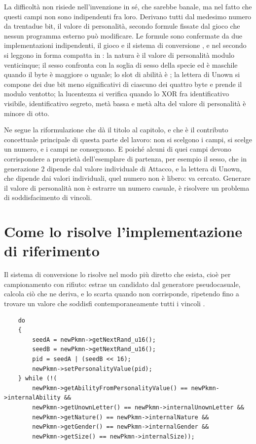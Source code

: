 La difficoltà non risiede nell'invenzione in sé, che sarebbe banale, ma nel fatto che questi campi non sono indipendenti fra loro. Derivano tutti dal medesimo numero da trentadue bit, il valore di personalità, secondo formule fissate dal gioco che nessun programma esterno può modificare. Le formule sono confermate da due implementazioni indipendenti, il gioco \cite{pokeemerald} e il sistema di conversione \cite{pccs}, e nel secondo si leggono in forma compatta in : la natura è il valore di personalità modulo venticinque; il sesso confronta  con la soglia di sesso della specie ed è maschile quando il byte è maggiore o uguale; lo slot di abilità è ; la lettera di Unown si compone dei due bit meno significativi di ciascuno dei quattro byte e prende il modulo ventotto; la lucentezza si verifica quando lo XOR fra identificativo visibile, identificativo segreto, metà bassa e metà alta del valore di personalità è minore di otto.

Ne segue la riformulazione che dà il titolo al capitolo, e che è il contributo concettuale principale di questa parte del lavoro: non si scelgono i campi, si scelge un numero, e i campi ne conseguono. E poiché alcuni di quei campi devono corrispondere a proprietà dell'esemplare di partenza, per esempio il sesso, che in generazione 2 dipende dal valore individuale di Attacco, e la lettera di Unown, che dipende dai valori individuali, quel numero non è libero: va cercato. Generare il valore di personalità non è estrarre un numero casuale, è risolvere un problema di soddisfacimento di vincoli.

\section{Come lo risolve l'implementazione di riferimento}

Il sistema di conversione lo risolve nel modo più diretto che esista, cioè per campionamento con rifiuto: estrae un candidato dal generatore pseudocasuale, calcola ciò che ne deriva, e lo scarta quando non corrisponde, ripetendo fino a trovare un valore che soddisfi contemporaneamente tutti i vincoli \cite{pccs}.

\begin{verbatim}
    do
    {
        seedA = newPkmn->getNextRand_u16();
        seedB = newPkmn->getNextRand_u16();
        pid = seedA | (seedB << 16);
        newPkmn->setPersonalityValue(pid);
    } while (!(
        newPkmn->getAbilityFromPersonalityValue() == newPkmn->internalAbility &&
        newPkmn->getUnownLetter() == newPkmn->internalUnownLetter &&
        newPkmn->getNature() == newPkmn->internalNature &&
        newPkmn->getGender() == newPkmn->internalGender &&
        newPkmn->getSize() == newPkmn->internalSize));
\end{verbatim}

